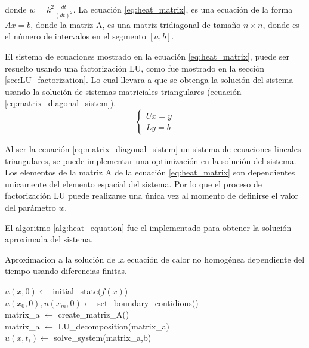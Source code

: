 donde $w=k^2\frac{dt}{(dt)^2}$. La ecuación \ref{eq:heat_matrix}, es una ecuación de la forma $Ax=b$, donde la matriz A, es una matriz tridiagonal de tamaño $n \times n$, donde  es el número de intervalos en el segmento $[a,b]$.

El sistema de ecuaciones mostrado en la ecuación \ref{eq:heat_matrix}, puede ser resuelto usando una factorización LU, como fue mostrado en la sección \ref{sec:LU_factorization}. Lo cual llevara a que se obtenga la solución del sistema usando la solución de sistemas matriciales triangulares (ecuación \ref{eq:matrix_diagonal_sistem}).
\begin{equation}
    \begin{cases}
        Ux=y \\
        Ly=b
    \end{cases} \label{eq:matrix_diagonal_sistem}
\end{equation}

Al ser la ecuación \ref{eq:matrix_diagonal_sistem} un sistema de ecuaciones lineales triangulares, se puede implementar una optimización en la solución del sistema. Los elementos de la matriz A de la ecuación \ref{eq:heat_matrix} son dependientes unicamente del elemento espacial del sistema. Por lo que el proceso de factorización LU puede realizarse una única vez al momento de definirse el valor del parámetro $w$.

El algoritmo \ref{alg:heat_equation} fue el implementado para obtener la solución aproximada del sistema.

\begin{algorithm}[H]
    \caption{Aproximacion a la solución de la ecuación de calor no homogénea dependiente del tiempo usando diferencias finitas.}
    \label{alg:heat_equation}
    $u(x,0) \gets$ initial\_state($f(x)$) \\
    $u(x_0,0),u(x_m,0) \gets$ set\_boundary\_contidions()\\
    matrix\_a $\gets$ create\_matriz\_A()\\
    matrix\_a $\gets$ LU\_decomposition(matrix\_a)\\
    {
    $u(x,t_i) \gets$ solve\_system(matrix\_a,b)
    }
\end{algorithm}